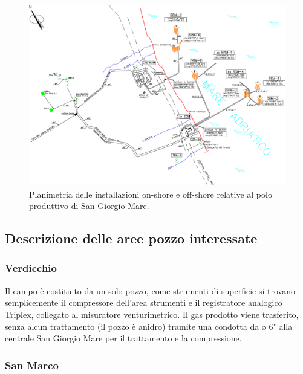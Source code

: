 \begin{landscape}
	\begin{figure}[htbp]
    	\centering
    	\includegraphics[width=\textwidth,height=\textheight,keepaspectratio]{fig/test/asset.eps}
    	\caption{Planimetria delle installazioni on-shore e off-shore relative al polo produttivo di San Giorgio Mare.}
    	\label{fig:asset}
	\end{figure}
\end{landscape}

\subsection{Descrizione delle aree pozzo interessate}
\subsubsection{Verdicchio}
Il campo è costituito da un solo pozzo, come strumenti di superficie si trovano semplicemente il compressore dell'area strumenti e il registratore analogico Triplex, collegato al misuratore venturimetrico.
Il gas prodotto viene trasferito, senza alcun trattamento (il pozzo è anidro) tramite una condotta da ø 6" alla centrale San Giorgio Mare per il trattamento e la compressione.
\subsubsection{San Marco}

